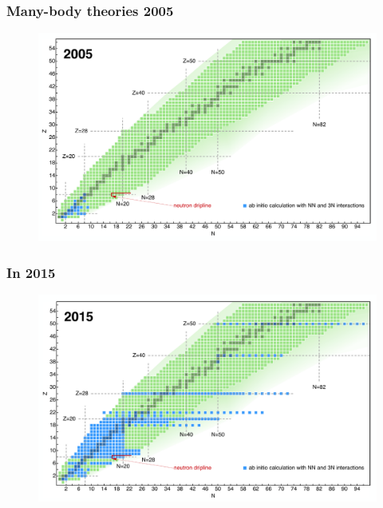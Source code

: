 \documentclass[compress]{beamer}
\begin{document}
\frame
{
  \frametitle{Many-body theories 2005}
      \begin{figure}[htp]
        \centering	
        	\includegraphics[width=1.1\textwidth]{Figures/abinitio2005.png}
      \end{figure}
}

\frame
{
  \frametitle{In 2015 }
      \begin{figure}[htp]
        \centering	
        	\includegraphics[width=1.1\textwidth]{Figures/abinitio2015.png}
      \end{figure}
}
\end{document}
